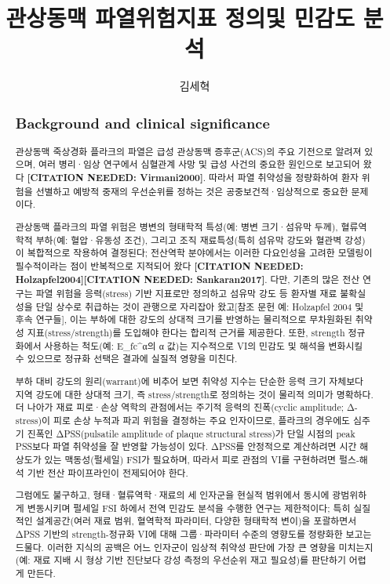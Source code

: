 \documentclass[preprint,12pt]{elsarticle}
\begin{document}
\begin{frontmatter}
\title{관상동맥 파열위험지표 정의및 민감도 분석}
\author[label1]{김세혁}
\begin{abstract}
\subsection{Background and clinical significance}
관상동맥 죽상경화 플라크의 파열은 급성 관상동맥 증후군(ACS)의 주요 기전으로 알려져 있으며, 여러 병리·임상 연구에서 심혈관계 사망 및 급성 사건의 중요한 원인으로 보고되어 왔다 \textbf{[CITATION NEEDED: Virmani2000]}\cite{l2013}. 따라서 파열 취약성을 정량화하여 환자 위험을 선별하고 예방적 중재의 우선순위를 정하는 것은 공중보건적·임상적으로 중요한 문제이다.

관상동맥 플라크의 파열 위험은 병변의 형태학적 특성(예: 병변 크기·섬유막 두께), 혈류역학적 부하(예: 혈압·유동성 조건), 그리고 조직 재료특성(특히 섬유막 강도와 혈관벽 강성)이 복합적으로 작용하여 결정된다; 전산역학 분야에서는 이러한 다요인성을 고려한 모델링이 필수적이라는 점이 반복적으로 지적되어 왔다 \textbf{[CITATION NEEDED: Holzapfel2004]}\cite{almohrej2022}\textbf{[CITATION NEEDED: Sankaran2017]}. 다만, 기존의 많은 전산 연구는 파열 위험을 응력(stress) 기반 지표로만 정의하고 섬유막 강도 등 환자별 재료 불확실성을 단일 상수로 취급하는 것이 관행으로 자리잡아 왔고[참조 문헌 예: Holzapfel 2004 및 후속 연구들], 이는 부하에 대한 강도의 상대적 크기를 반영하는 물리적으로 무차원화된 취약성 지표(stress/strength)를 도입해야 한다는 합리적 근거를 제공한다. 또한, strength 정규화에서 사용하는 척도(예: E\_fc\textasciicircum α의 α 값)는 지수적으로 VI의 민감도 및 해석을 변화시킬 수 있으므로 정규화 선택은 결과에 실질적 영향을 미친다.

부하 대비 강도의 원리(warrant)에 비추어 보면 취약성 지수는 단순한 응력 크기 자체보다 지역 강도에 대한 상대적 크기, 즉 stress/strength로 정의하는 것이 물리적 의미가 명확하다. 더 나아가 재료 피로·손상 역학의 관점에서는 주기적 응력의 진폭(cyclic amplitude; Δ-stress)이 피로 손상 누적과 파괴 위험을 결정하는 주요 인자이므로, 플라크의 경우에도 심주기 진폭인 ΔPSS(pulsatile amplitude of plaque structural stress)가 단일 시점의 peak PSS보다 파열 취약성을 잘 반영할 가능성이 있다. ΔPSS를 안정적으로 계산하려면 시간 해상도가 있는 맥동성(펄세일) FSI가 필요하며, 따라서 피로 관점의 VI를 구현하려면 펄스-해석 기반 전산 파이프라인이 전제되어야 한다.

그럼에도 불구하고, 형태·혈류역학·재료의 세 인자군을 현실적 범위에서 동시에 광범위하게 변동시키며 펄세일 FSI 하에서 전역 민감도 분석을 수행한 연구는 제한적이다; 특히 실질적인 설계공간(여러 재료 범위, 혈역학적 파라미터, 다양한 형태학적 변이)을 포괄하면서 ΔPSS 기반의 strength-정규화 VI에 대해 그룹·파라미터 수준의 영향도를 정량화한 보고는 드물다. 이러한 지식의 공백은 어느 인자군이 임상적 취약성 판단에 가장 큰 영향을 미치는지(예: 재료 지배 시 형상 기반 진단보다 강성 측정의 우선순위 재고 필요성)를 판단하기 어렵게 만든다.


\end{abstract}
\end{frontmatter}
\end{document}

